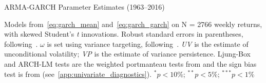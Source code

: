 
\begin{table}
  \centering
  \footnotesize
  \renewcommand{\arraystretch}{1.2}

  \caption{ARMA-GARCH Parameter Estimates (1963--2016)}

  \begin{longcaption}
    Models from~\autoref{eq:garch_mean} and~\autoref{eq:garch_garch} on N = 2766 weekly returns, with skewed Student's \emph{t} innovations. Robust standard errors in parentheses, following~\textcite{White1982}. $\omega$ is set using variance targeting, following~\textcite{EngleMezrich1995}. \emph{UV} is the estimate of unconditional volatility; \emph{VP} is the estimate of variance persistence. Ljung-Box and ARCH-LM tests are the weighted portmanteau tests from \textcite{FisherGallagher2012} and the sign bias test is from \textcite{EngleNg1993} (see~\autoref{app:univariate_diagnostics}). $^{*}p<10\%$; $^{**}p<5\%$; $^{***}p<1\%$
  \end{longcaption}
 

\end{table}
